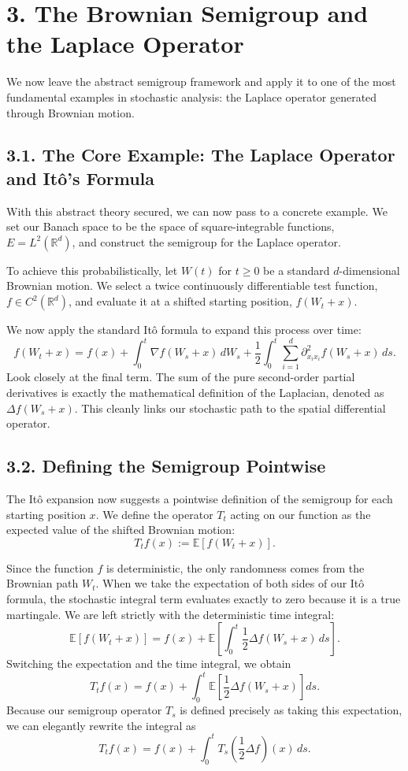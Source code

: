 \documentclass[11pt]{article}
\theoremstyle{definition}
\theoremstyle{remark}
\begin{document}
\section*{3. The Brownian Semigroup and the Laplace Operator}
We now leave the abstract semigroup framework and apply it to one of the most fundamental examples in stochastic analysis: the Laplace operator generated through Brownian motion.

\subsection*{3.1. The Core Example: The Laplace Operator and It\^o's Formula}
With this abstract theory secured, we can now pass to a concrete example. We set our Banach space to be the space of square-integrable functions, \(E=L^2(\mathbb R^d)\), and construct the semigroup for the Laplace operator.

To achieve this probabilistically, let \(W(t)\) for \(t\ge 0\) be a standard \(d\)-dimensional Brownian motion. We select a twice continuously differentiable test function, \(f\in C^2(\mathbb R^d)\), and evaluate it at a shifted starting position, \(f(W_t+x)\).

We now apply the standard It\^o formula to expand this process over time:
\[
f(W_t+x)
=
f(x)+\int_0^t \nabla f(W_s+x)\,dW_s+\frac12\int_0^t \sum_{i=1}^d \partial_{x_i x_i}^2 f(W_s+x)\,ds.
\]
Look closely at the final term. The sum of the pure second-order partial derivatives is exactly the mathematical definition of the Laplacian, denoted as \(\Delta f(W_s+x)\). This cleanly links our stochastic path to the spatial differential operator.

\subsection*{3.2. Defining the Semigroup Pointwise}
The It\^o expansion now suggests a pointwise definition of the semigroup for each starting position \(x\). We define the operator \(T_t\) acting on our function as the expected value of the shifted Brownian motion:
\[
T_t f(x):=\mathbb E[f(W_t+x)].
\]

Since the function \(f\) is deterministic, the only randomness comes from the Brownian path \(W_t\). When we take the expectation of both sides of our It\^o formula, the stochastic integral term evaluates exactly to zero because it is a true martingale. We are left strictly with the deterministic time integral:
\[
\mathbb E[f(W_t+x)]
=
f(x)+\mathbb E\left[\int_0^t \frac12 \Delta f(W_s+x)\,ds\right].
\]
Switching the expectation and the time integral, we obtain
\[
T_t f(x)
=
f(x)+\int_0^t \mathbb E\!\left[\frac12 \Delta f(W_s+x)\right]ds.
\]
Because our semigroup operator \(T_s\) is defined precisely as taking this expectation, we can elegantly rewrite the integral as
\[
T_t f(x)
=
f(x)+\int_0^t T_s\!\left(\frac12 \Delta f\right)(x)\,ds.
\]
\end{document}
